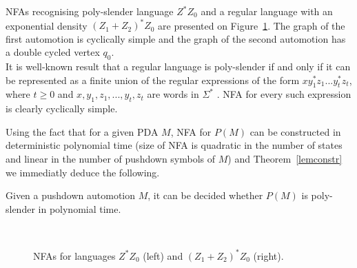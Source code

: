 \begin{example}
NFAs recognising poly-slender language $Z^*Z_0$ and a regular language with an exponential density ${(Z_1+Z_2)}^*Z_0$ are presented on Figure~\ref{graphufn}. The graph of the first automotion is cyclically simple and the graph of the second automotion has a double cycled vertex $q_0$. 
\\It is well-known result that a regular language is poly-slender if and only if it can be represented as a finite union of the regular expressions of the form $xy^*_1z_1... y^*_tz_t$, where $t \ge 0$ and $x, y_1, z_1, ... , y_t, z_t$ are words in $\Sigma^*$ \cite{poldens}. NFA for every such expression is clearly cyclically simple. 
\end{example}
Using the fact that for a given PDA $M$, NFA for $P(M)$ can be constructed in deterministic polynomial time (size of NFA is quadratic in the number of states and linear in the number of pushdown symbols of $M$) \cite*{Geffert, Malcher} and Theorem~\ref{lemconstr} we immediatly deduce the following.
\begin{corollary}
Given a pushdown automotion $M$, it can be decided whether $P(M)$ is poly-slender in polynomial time.
\end{corollary}

\begin{figure}
\\
	\caption{NFAs for languages $Z^*Z_0$ (left) and ${(Z_1+Z_2)}^*Z_0$ (right).}
\label{graphufn}
\end{figure}

